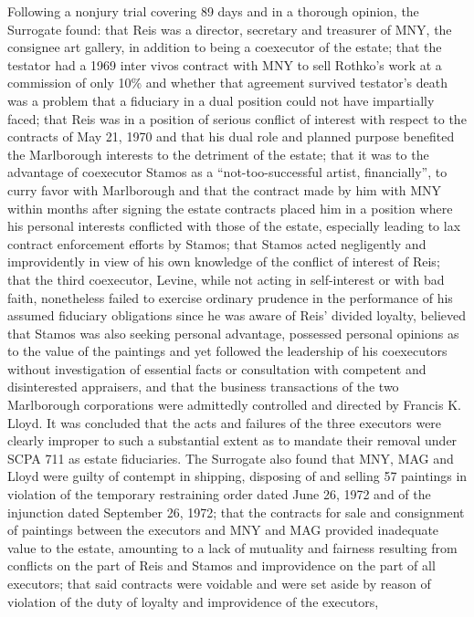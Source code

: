 Following a nonjury trial covering 89 days and in a thorough opinion, the
Surrogate found: that Reis was a director, secretary and treasurer of MNY, the
consignee art gallery, in addition to being a coexecutor of the estate; that the
testator had a 1969 inter vivos contract with MNY to sell Rothko's work at a
commission of only 10\% and whether that agreement survived testator's death was
a problem that a fiduciary in a dual position could not have impartially faced;
that Reis was in a position of serious conflict of interest with respect to the
contracts of May 21, 1970 and that his dual role and planned purpose benefited
the Marlborough interests to the detriment of the estate; that it was to the
advantage of coexecutor Stamos as a ``not-too-successful artist, financially'',
to curry favor with Marlborough and that the contract made by him with MNY
within months after signing the estate contracts placed him in a position where
his personal interests conflicted with those of the estate, especially leading
to lax contract enforcement efforts by Stamos; that Stamos acted negligently and
improvidently in view of his own knowledge of the conflict of interest of Reis;
that the third coexecutor, Levine, while not acting in self-interest or with bad
faith, nonetheless failed to exercise ordinary prudence in the performance of
his assumed fiduciary obligations since he was aware of Reis' divided loyalty,
believed that Stamos was also seeking personal advantage, possessed personal
opinions as to the value of the paintings and yet followed the leadership of his
coexecutors without investigation of essential facts or consultation with
competent and disinterested appraisers, and that the business transactions of
the two Marlborough corporations were admittedly controlled and directed by
Francis K. Lloyd. It was concluded that the acts and failures of the three
executors were clearly improper to such a substantial extent as to mandate their
removal under SCPA 711 as estate fiduciaries. The Surrogate also found that MNY,
MAG and Lloyd were guilty of contempt in shipping, disposing of and selling 57
paintings in violation of the temporary restraining order dated June 26, 1972
and of the injunction dated September 26, 1972; that the contracts for sale and
consignment of paintings between the executors and MNY and MAG provided
inadequate value to the estate, amounting to a lack of mutuality and fairness
resulting from conflicts on the part of Reis and Stamos and improvidence on the
part of all executors; that said contracts were voidable and were set aside by
reason of violation of the duty of loyalty and improvidence of the executors,
